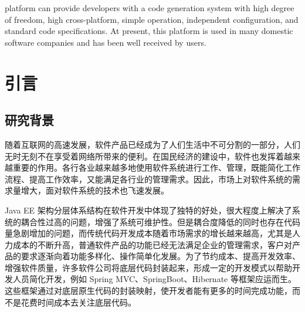 \documentclass{izdthesis}
\begin{document}
\begin{enabstract}
platform can provide developers with a code generation system with high degree of freedom, high cross-platform, simple operation, independent configuration, and standard code specifications. At present, this platform is used in many domestic software companies and has been well received by users.

\end{enabstract}

\izdtableofcontents

\izdmainmatter

\chapter{引言}

\section{研究背景}
随着互联网的高速发展，软件产品已经成为了人们生活中不可分割的一部分，人们无时无刻不在享受着网络所带来的便利。在国民经济的建设中，软件也发挥着越来越重要的作用。各行各业越来越多地使用软件系统进行工作、管理，既能简化工作流程、提高工作效率，又能满足各行业的管理需求。因此，市场上对软件系统的需求量增大，面对软件系统的技术也飞速发展。

Java EE 架构分层体系结构在软件开发中体现了独特的好处，很大程度上解决了系统的耦合性过高的问题，增强了系统可维护性。但是耦合度降低的同时也存在代码量急剧增加的问题\cite{ref1}，而传统代码开发成本随着市场需求的增长越来越高，尤其是人力成本的不断升高，普通软件产品的功能已经无法满足企业的管理需求，客户对产品的要求逐渐向着功能多样化、操作简单化发展。为了节约成本、提高开发效率、增强软件质量，许多软件公司将底层代码封装起来，形成一定的开发模式以帮助开发人员简化开发，例如 Spring MVC、SpringBoot、Hibernate 等框架应运而生。这些框架通过对底层原生代码的封装映射，使开发者能有更多的时间完成功能，而不是花费时间成本去关注底层代码。
\end{document}
